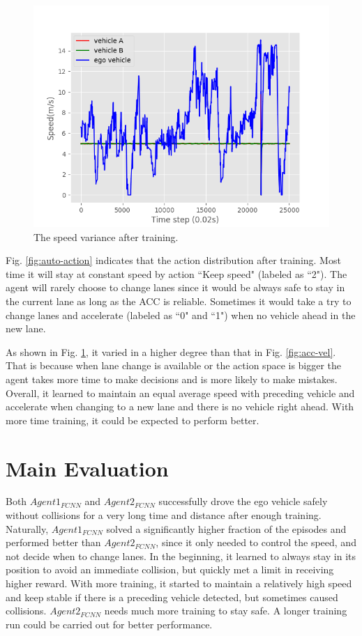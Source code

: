 \begin{figure}[h]
\centering
\includegraphics[width=1.0\textwidth]{figs/ch5/auto_vel}
\caption{The speed variance after training.}
\label{fig:auto-vel}
\end{figure}

Fig. \ref{fig:auto-action} indicates that the action distribution after training. Most time it will stay at constant speed by action ``Keep speed" (labeled as ``2"). The agent will rarely choose to change lanes since it would be always safe to stay in the current lane as long as the ACC is reliable. Sometimes it would take a try to change lanes and accelerate (labeled as ``0" and ``1") when no vehicle ahead in the new lane. 

As shown in Fig. \ref{fig:auto-vel}, it varied in a higher degree than that in Fig. \ref{fig:acc-vel}. That is because when lane change is available or the action space is bigger the agent takes more time to make decisions and is more likely to make mistakes. Overall, it learned to maintain an equal average speed with preceding vehicle and accelerate when changing to a new lane and there is no vehicle right ahead. With more time training, it could be expected to perform better.

\section{Main Evaluation}

Both $Agent1_{FCNN}$ and $Agent2_{FCNN}$ successfully drove the ego vehicle safely without collisions for a very long time and distance after enough training. Naturally, $Agent1_{FCNN}$ solved a significantly higher fraction of the episodes and performed better than $Agent2_{FCNN}$, since it only needed to control the speed, and not decide when to change lanes. In the beginning, it learned to always stay in its position to avoid an immediate collision, but quickly met a limit in receiving higher reward. With more training, it started to maintain a relatively high speed and keep stable if there is a preceding vehicle detected, but sometimes caused collisions. $Agent2_{FCNN}$ needs much more training to stay safe. A longer training run could be carried out for better performance.
